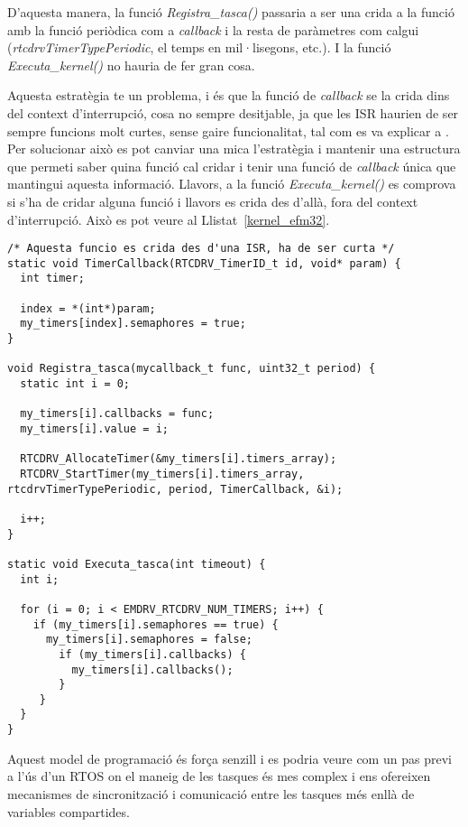 D'aquesta manera, la funció {\em Registra\_tasca()} passaria a ser una crida a la funció  amb la funció periòdica com a {\em callback} i la resta de paràmetres com calgui ({\em rtcdrvTimerTypePeriodic}, el temps en mil·lisegons, etc.). I la funció {\em Executa\_kernel()} no hauria de fer gran cosa.

Aquesta estratègia te un problema, i és que la funció de {\em callback} se la crida dins del context d'interrupció, cosa no sempre desitjable, ja que les ISR haurien de ser sempre funcions molt curtes, sense gaire funcionalitat, tal com es va explicar a . Per solucionar això es pot canviar una mica l'estratègia i mantenir una estructura que permeti saber quina funció cal cridar i tenir una funció de {\em callback} única que mantingui aquesta informació. Llavors, a la funció {\em Executa\_kernel()} es comprova si s'ha de cridar alguna funció i llavors es crida des d'allà, fora del context d'interrupció. Això es pot veure al Llistat~\ref{kernel_efm32}.

\begin{lstlisting}[style=customc,caption={Estructura bàsica de la funció Executa\_kernel()},label=kernel_efm32]
/* Aquesta funcio es crida des d'una ISR, ha de ser curta */
static void TimerCallback(RTCDRV_TimerID_t id, void* param) {
  int timer;
  
  index = *(int*)param;
  my_timers[index].semaphores = true;
}

void Registra_tasca(mycallback_t func, uint32_t period) {
  static int i = 0;
  
  my_timers[i].callbacks = func;
  my_timers[i].value = i;
  
  RTCDRV_AllocateTimer(&my_timers[i].timers_array);
  RTCDRV_StartTimer(my_timers[i].timers_array, rtcdrvTimerTypePeriodic, period, TimerCallback, &i);
  
  i++;
}

static void Executa_tasca(int timeout) {
  int i;
  
  for (i = 0; i < EMDRV_RTCDRV_NUM_TIMERS; i++) {
    if (my_timers[i].semaphores == true) {
      my_timers[i].semaphores = false;
        if (my_timers[i].callbacks) {
          my_timers[i].callbacks();
        }
     }
  }
}
\end{lstlisting}

Aquest model de programació és força senzill i es podria veure com un pas previ a l'ús d'un RTOS on el maneig de les tasques és mes complex i ens ofereixen mecanismes de sincronització i comunicació entre les tasques més enllà de variables compartides.

